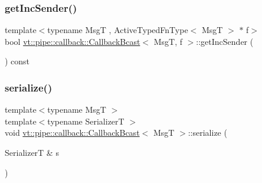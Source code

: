 \subsubsection{\texorpdfstring{get\+Inc\+Sender()}{getIncSender()}}
{\footnotesize\ttfamily template$<$typename MsgT , Active\+Typed\+Fn\+Type$<$ Msg\+T $>$ $\ast$ f$>$ \\
bool \hyperlink{structvt_1_1pipe_1_1callback_1_1_callback_bcast}{vt\+::pipe\+::callback\+::\+Callback\+Bcast}$<$ MsgT, f $>$\+::get\+Inc\+Sender (\begin{DoxyParamCaption}{ }\end{DoxyParamCaption}) const\hspace{0.3cm}{\ttfamily [inline]}}

\mbox{\label{structvt_1_1pipe_1_1callback_1_1_callback_bcast_a2337a0d2bda968f7ab1e4c85c3dbe67a}} 
\subsubsection{\texorpdfstring{serialize()}{serialize()}}
{\footnotesize\ttfamily template$<$typename MsgT $>$ \\
template$<$typename SerializerT $>$ \\
void \hyperlink{structvt_1_1pipe_1_1callback_1_1_callback_bcast}{vt\+::pipe\+::callback\+::\+Callback\+Bcast}$<$ MsgT $>$\+::serialize (\begin{DoxyParamCaption}\item[{SerializerT \&}]{s }\end{DoxyParamCaption})}

\mbox{\label{structvt_1_1pipe_1_1callback_1_1_callback_bcast_acc7d0eda09ac15644f876fdab691e269}} 
